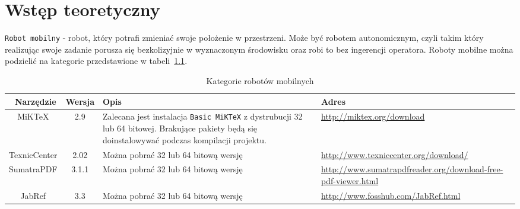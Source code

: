 \chapter{Wstęp teoretyczny}
\texttt{Robot mobilny} - robot, który potrafi zmieniać swoje położenie w przestrzeni. Może być robotem autonomicznym, czyli takim który realizując swoje zadanie porusza się bezkolizyjnie w wyznaczonym środowisku oraz robi to bez ingerencji operatora.
Roboty mobilne można podzielić na kategorie przedstawione w tabeli~\ref{tab:kategorieRobotow}.
\begin{table}[htb] \small
	\centering
	\caption{Kategorie robotów mobilnych}
	\label{tab:kategorieRobotow}
	\begin{tabularx}{\linewidth}{|c|c|X|p{6cm}|} \hline\
		Narzędzie & Wersja & Opis & Adres \\ \hline\hline
		MiKTeX & 2.9 & Zalecana jest instalacja \texttt{Basic MiKTeX} z dystrubucji 32 lub 64 bitowej. Brakujące pakiety będą się doinstalowywać podczas kompilacji projektu. &
		\url{http://miktex.org/download} \\ \hline
		TexnicCenter & 2.02 &  Można pobrać 32 lub 64 bitową wersję & \url{http://www.texniccenter.org/download/} \\ \hline
		SumatraPDF & 3.1.1 & Można pobrać 32 lub 64 bitową wersję & \url{http://www.sumatrapdfreader.org/download-free-pdf-viewer.html} \\ \hline
		JabRef & 3.3 & Można pobrać 32 lub 64 bitową wersję & \url{http://www.fosshub.com/JabRef.html} \\ \hline
	\end{tabularx}
\end{table}
